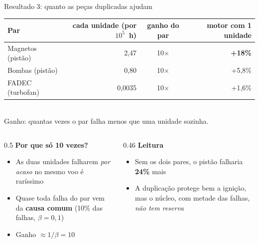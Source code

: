 \documentclass[aspectratio=169,11pt]{beamer}
\newcommand{\destaque}[1]{{\color{ieeeblue}\bfseries #1}}
\newcommand{\pcmh}{por $10^5$~h}
\begin{document}
\begin{frame}{Resultado 3: quanto as peças duplicadas ajudam}
  \centering
  \begin{tabular}{@{}lrcr@{}}
    \toprule
    Par & cada unidade (\pcmh) & ganho do par & motor com 1 unidade \\
    \midrule
    Magnetos (pistão) & 2,47 & 10$\times$ & \destaque{+18\%} \\
    Bombas (pistão) & 0,80 & 10$\times$ & +5,8\% \\
    FADEC (turbofan) & 0,0035 & 10$\times$ & +1,6\% \\
    \bottomrule
  \end{tabular}
  \\[1mm]{\scriptsize\color{cinza} Ganho: quantas vezes o par falha menos que uma unidade sozinha.}
  \vspace{3mm}
  \begin{columns}[T]
    \begin{column}{0.5\textwidth}
      \small
      \textbf{Por que só 10 vezes?}
      \begin{itemize}
        \item As duas unidades falharem \emph{por acaso} no mesmo voo é raríssimo
        \item Quase toda falha do par vem da \textbf{causa comum} (10\% das falhas, $\beta=0{,}1$)
        \item Ganho $\approx 1/\beta = 10$
      \end{itemize}
    \end{column}
    \begin{column}{0.46\textwidth}
      \small
      \textbf{Leitura}
      \begin{itemize}
        \item Sem os dois pares, o pistão falharia \destaque{24\%} mais
        \item A duplicação protege bem a ignição, mas o núcleo, com metade das falhas, \emph{não tem reserva}
      \end{itemize}
    \end{column}
  \end{columns}
\end{frame}
\end{document}
